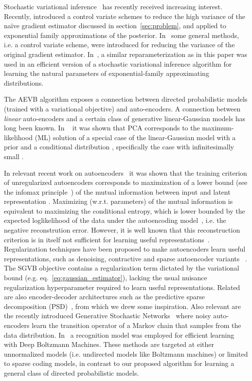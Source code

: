 \documentclass{article} \usepackage{nips13submit_e,times}
\theoremstyle{definition}
\theoremstyle{definition}
\begin{document}
Stochastic variational inference~\cite{hoffman2013stochastic} has recently received increasing interest. Recently, \cite{blei2012variational} introduced a control variate schemes to reduce the high variance of the na\"ive gradient estimator discussed in section~\ref{sec:problem}, and applied to exponential family approximations of the posterior. In~\cite{ranganath2013black} some general methods, i.e. a control variate scheme, were introduced for reducing the variance of the original gradient estimator. In~\cite{salimans2013fixedform}, a similar reparameterization as in this paper was used in an efficient version of a stochastic variational inference algorithm for learning the natural parameters of exponential-family approximating distributions.





The AEVB algorithm exposes a connection between directed probabilistic models (trained with a variational objective) and auto-encoders. A connection between \emph{linear} auto-encoders and a certain class of generative linear-Gaussian models has long been known. In ~\cite{roweis1998algorithms} it was shown that PCA corresponds to the maximum-likelihood (ML) solution of a special case of the linear-Gaussian model with a prior  and a conditional distribution , specifically the case with infinitesimally small . 


In relevant recent work on autoencoders~\cite{vincent2010stacked} it was shown that the training criterion of unregularized autoencoders corresponds to maximization of a lower bound (see the infomax principle~\cite{linsker1989application}) of the mutual information between input  and latent representation . Maximizing (w.r.t. parameters) of the mutual information is equivalent to maximizing the conditional entropy, which is lower bounded by the expected loglikelihood of the data under the autoencoding model~\cite{vincent2010stacked}, i.e. the negative reconstrution error.
However, it is well known that this reconstruction criterion is in itself not sufficient for learning useful representations~\cite{bengio2013representation}.
Regularization techniques have been proposed to make autoencoders learn useful representations, such as  denoising, contractive and sparse autoencoder variants~ \cite{bengio2013representation}. The SGVB objective contains a regularization term dictated by the variational bound (e.g. eq.~\eqref{eq:gaussian_estimator}), lacking the usual nuisance regularization hyperparameter required to learn useful representations.
Related are also encoder-decoder architectures such as the predictive sparse decomposition (PSD)~\cite{koray-psd-08}, from which we drew some inspiration. Also relevant are the recently introduced Generative Stochastic Networks~\cite{bengio2013deep} where noisy auto-encoders learn the transition operator of a Markov chain that samples from the data distribution. In~\cite{salakhutdinov2010efficient} a recognition model was employed for efficient learning with Deep Boltzmann Machines.
These methods are targeted at either unnormalized models (i.e. undirected models like Boltzmann machines) or limited to sparse coding models, in contrast to our proposed algorithm for learning a general class of directed probabilistic models.
\end{document}
